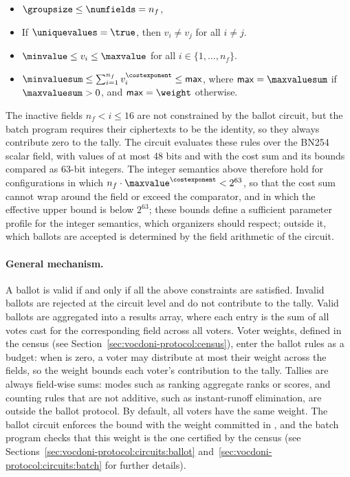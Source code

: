 \begin{itemize}
	\item $\groupsize \le \numfields = n_f$,
	\item If $\uniquevalues = \true$, then $v_i \neq v_j$ for all $i\neq j$.
	\item $\minvalue \leq v_i \leq \maxvalue$ for all $i\in\{1, \dots, n_f\}$.
	\item $\minvaluesum \leq \sum_{i=1}^{n_f} v_i^{\costexponent} \leq \mathsf{max}$, where $\mathsf{max} = \maxvaluesum$ if $\maxvaluesum > 0$, and $\mathsf{max} = \weight$ otherwise.
\end{itemize}
The inactive fields $n_f < i \le 16$ are not constrained by the ballot circuit, but the batch program requires their ciphertexts to be the identity, so they always contribute zero to the tally. The circuit evaluates these rules over the BN254 scalar field, with values of at most 48 bits and with the cost sum and its bounds compared as 63-bit integers. The integer semantics above therefore hold for configurations in which $n_f \cdot \maxvalue^{\costexponent} < 2^{63}$, so that the cost sum cannot wrap around the field or exceed the comparator, and in which the effective upper bound is below $2^{63}$; these bounds define a sufficient parameter profile for the integer semantics, which organizers should respect; outside it, which ballots are accepted is determined by the field arithmetic of the circuit.

\paragraph{General mechanism.}
A ballot is valid if and only if all the above constraints are satisfied. Invalid ballots are rejected at the circuit level and do not contribute to the tally. Valid ballots are aggregated into a results array, where each entry is the sum of all votes cast for the corresponding field across all voters. Voter weights, defined in the census (see Section~\ref{sec:vocdoni-protocol:census}), enter the ballot rules as a budget: when \maxvaluesum is zero, a voter may distribute at most their weight across the fields, so the weight bounds each voter's contribution to the tally. Tallies are always field-wise sums: modes such as ranking aggregate ranks or scores, and counting rules that are not additive, such as instant-runoff elimination, are outside the ballot protocol. By default, all voters have the same weight. The ballot circuit enforces the bound with the weight committed in \ballotinputshash, and the batch program checks that this weight is the one certified by the census (see Sections~\ref{sec:vocdoni-protocol:circuits:ballot} and~\ref{sec:vocdoni-protocol:circuits:batch} for further details).

